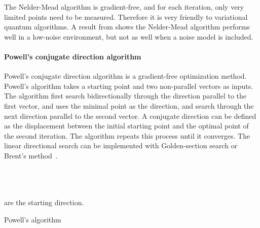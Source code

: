 \vspace{0.5cm}


The Nelder-Mead algorithm is gradient-free, and for each iteration, only very limited points need to be measured. Therefore it is very friendly to variational quantum algorithms.  A result from \cite{Lavrijsen2020ClassicalDevices,Pellow-Jarman2021} shows the Nelder-Mead algorithm performs well in a low-noise environment, but not as well when a noise model is included.  

\paragraph{Powell's conjugate direction algorithm}

Powell's conjugate direction algorithm is a gradient-free optimization method. Powell's algorithm takes a starting point and two non-parallel vectors as inputs. The algorithm first search bidirectionally through the direction parallel to the first vector, and uses the minimal point as the direction, and search through the next direction parallel to the second vector. A conjugate direction can be defined as the displacement between the initial starting point and the optimal point of the second iteration. The algorithm repeats this process until it converges. The linear directional search can be implemented with Golden-section search or Brent's method~\cite{Powell1964}. 

\begin{algorithm}[H]
\SetAlgoNoLine%
 

 \\
\\
\\
 are the starting direction.\\
 \caption{Powell's algorithm}
\end{algorithm}

